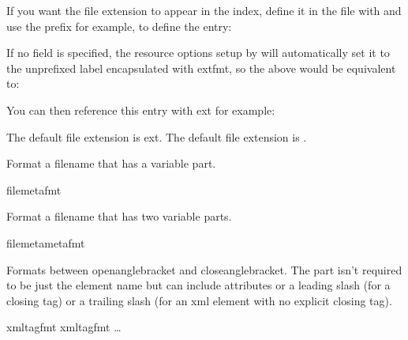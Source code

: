 \documentclass[toc=listof]{scrreport}
\begin{document}
If you want the file extension to appear in the index, define it in
the  file with  and use the prefix
 for example, to define the  entry:
\begin{codebox}
\end{codebox}
If no  field is specified, the resource options setup by
 will automatically set it to the unprefixed label
encapsulated with \gls{extfmt}, so the above would be equivalent to:
\begin{codebox}
\end{codebox}
You can then reference this entry with \gls{ext} for example:
\begin{coderesult}
The default file extension is \gls{ext}.
\tcblower
The default file extension is .
\end{coderesult}

Format a filename that has a variable part.
\begin{coderesult}
\gls{filemetafmt}
\tcblower
{}
\end{coderesult}

Format a filename that has two variable parts.
\begin{coderesult}
\gls{filemetametafmt}\marg{-}
\tcblower
{}
\end{coderesult}

Formats  between \gls{openanglebracket} and
\gls{closeanglebracket}. The  part isn't required to be just the element
name but can include attributes or a leading slash (for a closing
tag) or a trailing slash (for an \gls{xml} element with no explicit
closing tag).
\begin{coderesult}
\gls{xmltagfmt}
\gls{xmltagfmt}
\tcblower
{}\ldots
{}
\end{coderesult}
\end{document}
